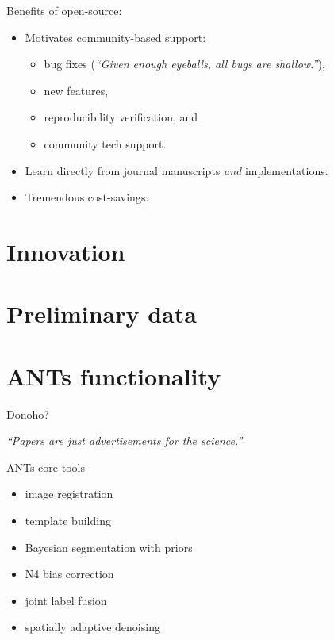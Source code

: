 \documentclass[ignorenonframetext,]{beamer}
\begin{document}
\begin{frame}{Benefits of open-source:}

\begin{itemize}
\itemsep1pt\parskip0pt
\item
  Motivates community-based support:

  \begin{itemize}
  \itemsep1pt\parskip0pt
  \item
    bug fixes (\emph{``Given enough eyeballs, all bugs are shallow.''}),
  \item
    new features,
  \item
    reproducibility verification, and
  \item
    community tech support.
  \end{itemize}
\item
  Learn directly from journal manuscripts \emph{and} implementations.
\item
  Tremendous cost-savings.
\end{itemize}

\end{frame}

\section{Innovation}\label{innovation}

\section{Preliminary data}\label{preliminary-data}

\section{ANTs functionality}\label{ants-functionality}

\begin{frame}{Donoho?}

 \emph{``Papers are just advertisements for the science.''}

\end{frame}

\begin{frame}{ANTs core tools}

\begin{itemize}
\itemsep1pt\parskip0pt
\item
  image registration
\item
  template building
\item
  Bayesian segmentation with priors
\item
  N4 bias correction
\item
  joint label fusion
\item
  spatially adaptive denoising
\end{itemize}

\end{frame}
\end{document}
